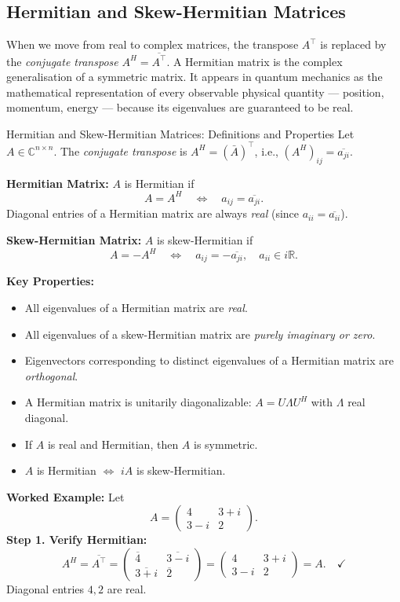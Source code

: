 \documentclass[12pt,a4paper]{article}
\begin{document}
\subsection{Hermitian and Skew-Hermitian Matrices}

When we move from real to complex matrices, the transpose $A^\top$ is replaced by the \emph{conjugate transpose} $A^H = \overline{A^\top}$.
A Hermitian matrix is the complex generalisation of a symmetric matrix.
It appears in quantum mechanics as the mathematical representation of every observable physical quantity --- position, momentum, energy --- because its eigenvalues are guaranteed to be real.

\begin{infobox}{Hermitian and Skew-Hermitian Matrices: Definitions and Properties}
Let $A \in \mathbb{C}^{n \times n}$. The \emph{conjugate transpose} is $A^H = (\bar{A})^\top$, i.e., $(A^H)_{ij} = \overline{a_{ji}}$.

\textbf{Hermitian Matrix:} $A$ is Hermitian if
\[
  A = A^H \quad \Longleftrightarrow \quad a_{ij} = \overline{a_{ji}}.
\]
Diagonal entries of a Hermitian matrix are always \emph{real} (since $a_{ii} = \overline{a_{ii}}$).

\textbf{Skew-Hermitian Matrix:} $A$ is skew-Hermitian if
\[
  A = -A^H \quad \Longleftrightarrow \quad a_{ij} = -\overline{a_{ji}}, \quad a_{ii} \in i\mathbb{R}.
\]

\textbf{Key Properties:}
\begin{itemize}
  \item All eigenvalues of a Hermitian matrix are \emph{real}.
  \item All eigenvalues of a skew-Hermitian matrix are \emph{purely imaginary or zero}.
  \item Eigenvectors corresponding to distinct eigenvalues of a Hermitian matrix are \emph{orthogonal}.
  \item A Hermitian matrix is unitarily diagonalizable: $A = U\Lambda U^H$ with $\Lambda$ real diagonal.
  \item If $A$ is real and Hermitian, then $A$ is symmetric.
  \item $A$ is Hermitian $\Longleftrightarrow$ $iA$ is skew-Hermitian.
\end{itemize}
\end{infobox}

\textbf{Worked Example:} Let
\[
  A = \begin{pmatrix} 4 & 3+i \\ 3-i & 2 \end{pmatrix}.
\]
\textbf{Step 1. Verify Hermitian:}
\[
  A^H = \overline{A^\top} = \begin{pmatrix} \overline{4} & \overline{3-i} \\ \overline{3+i} & \overline{2} \end{pmatrix}
      = \begin{pmatrix} 4 & 3+i \\ 3-i & 2 \end{pmatrix} = A. \quad \checkmark
\]
Diagonal entries $4, 2$ are real. \quad \checkmark
\end{document}
